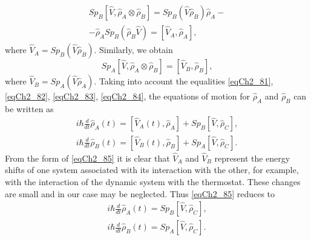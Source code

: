 \begin{eqnarray}
Sp_B \left[\hat{V}, \hat{\rho}_{A} \otimes \hat{\rho}_{B}\right] = 
Sp_B\left(\hat{V} \hat{\rho}_{B}\right) \hat{\rho}_{A} - 
\nonumber \\
-
\hat{\rho}_{A} Sp_B \left(\hat{\rho}_{B} \hat{V}\right) = 
\left[\hat{V}_A, \hat{\rho}_A\right],
\label{eqCh2_83}
\end{eqnarray}
where $\hat{V}_A = Sp_B\left(\hat{V}\hat{\rho}_B\right)$. Similarly, we obtain 
\begin{equation}
Sp_A \left[\hat{V}, \hat{\rho}_{A} \otimes \hat{\rho}_{B}\right] =
\left[\hat{V}_B, \hat{\rho}_B\right],
\label{eqCh2_84}
\end{equation}
where $\hat{V}_B= Sp_A\left(\hat{V}\hat{\rho}_A\right)$.  
Taking into account the equalities \eqref{eqCh2_81}, \eqref{eqCh2_82},
\eqref{eqCh2_83}, \eqref{eqCh2_84}, the equations of motion 
for $\hat{\rho}_{A}$ and $\hat{\rho}_{B}$ can be written as  
\begin{eqnarray}
i\hbar\frac{d}{d t} \hat{\rho}_A\left(t\right) = 
\left[\hat{V}_A\left(t\right), \hat{\rho}_A\right] +
Sp_B \left[\hat{V}, \hat{\rho}_C\right],
\nonumber \\
i\hbar\frac{d}{d t} \hat{\rho}_B\left(t\right) = 
\left[\hat{V}_B\left(t\right), \hat{\rho}_B\right] +
Sp_A \left[\hat{V}, \hat{\rho}_C\right].
\label{eqCh2_85}
\end{eqnarray}
From the form of \eqref{eqCh2_85} it is clear that $\hat{V}_A$ and $\hat{V}_B$ represent the energy shifts of one system associated with its interaction with the other, for example, with the interaction of the dynamic system with the thermostat. These changes are small and in our case may be neglected. Thus \eqref{eqCh2_85} reduces to 
\begin{eqnarray}
i\hbar\frac{d}{d t} \hat{\rho}_A\left(t\right) = 
Sp_B \left[\hat{V}, \hat{\rho}_C\right],
\nonumber \\
i\hbar\frac{d}{d t} \hat{\rho}_B\left(t\right) = 
Sp_A \left[\hat{V}, \hat{\rho}_C\right].
\label{eqCh2_85a}
\end{eqnarray}

